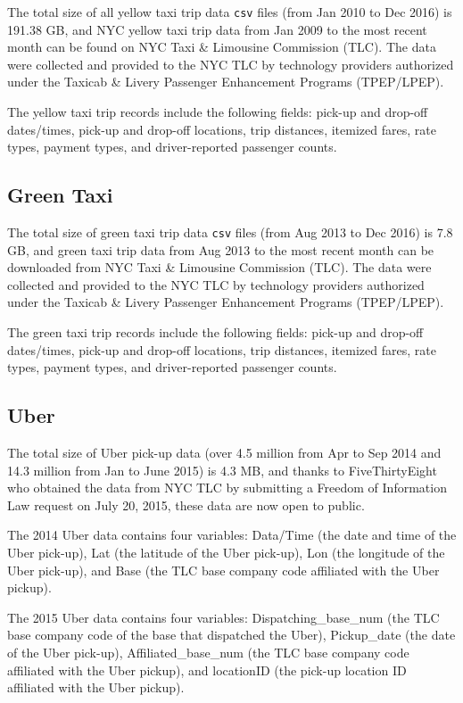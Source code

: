 \documentclass[12pt,twoside]{reedthesis}
\theoremstyle{definition}
\theoremstyle{definition}
\theoremstyle{definition}
\theoremstyle{remark}
\begin{document}
The total size of all yellow taxi trip data \texttt{csv} files (from Jan
2010 to Dec 2016) is 191.38 GB, and NYC yellow taxi trip data from Jan
2009 to the most recent month can be found on NYC Taxi \& Limousine
Commission (TLC). The data were collected and provided to the NYC TLC by
technology providers authorized under the Taxicab \& Livery Passenger
Enhancement Programs (TPEP/LPEP).

The yellow taxi trip records include the following fields: pick-up and
drop-off dates/times, pick-up and drop-off locations, trip distances,
itemized fares, rate types, payment types, and driver-reported passenger
counts.

\subsection{Green Taxi}\label{green-taxi-1}

The total size of green taxi trip data \texttt{csv} files (from Aug 2013
to Dec 2016) is 7.8 GB, and green taxi trip data from Aug 2013 to the
most recent month can be downloaded from NYC Taxi \& Limousine
Commission (TLC). The data were collected and provided to the NYC TLC by
technology providers authorized under the Taxicab \& Livery Passenger
Enhancement Programs (TPEP/LPEP).

The green taxi trip records include the following fields: pick-up and
drop-off dates/times, pick-up and drop-off locations, trip distances,
itemized fares, rate types, payment types, and driver-reported passenger
counts.

\subsection{Uber}\label{uber-1}

The total size of Uber pick-up data (over 4.5 million from Apr to Sep
2014 and 14.3 million from Jan to June 2015) is 4.3 MB, and thanks to
FiveThirtyEight who obtained the data from NYC TLC by submitting a
Freedom of Information Law request on July 20, 2015, these data are now
open to public.

The 2014 Uber data contains four variables: Data/Time (the date and time
of the Uber pick-up), Lat (the latitude of the Uber pick-up), Lon (the
longitude of the Uber pick-up), and Base (the TLC base company code
affiliated with the Uber pickup).

The 2015 Uber data contains four variables: Dispatching\_base\_num (the
TLC base company code of the base that dispatched the Uber),
Pickup\_date (the date of the Uber pick-up), Affiliated\_base\_num (the
TLC base company code affiliated with the Uber pickup), and locationID
(the pick-up location ID affiliated with the Uber pickup).
\end{document}
